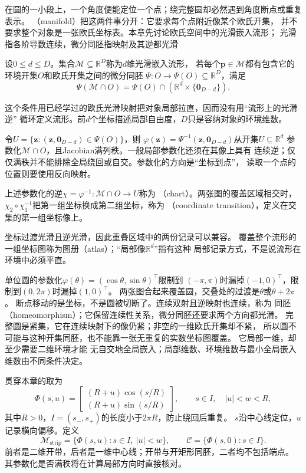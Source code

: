 在圆的一小段上，一个角度便能定位一个点；绕完整圆却必然遇到角度断点或重复表示。
（manifold）把这两件事分开：它要求每个点附近像某个欧氏开集，
并不要求整个对象是一张欧氏坐标表。本章先讨论欧氏空间中的光滑嵌入流形；
光滑指各阶导数连续，微分同胚指映射及其逆都光滑

\begin{definition}[光滑嵌入流形]
\label{def:geometry-embedded-manifold}
设$0\leq d\leq D$。集合$\mathcal M\subseteq\mathbb R^D$称为$d$维光滑嵌入流形，
若每个$\bm p\in\mathcal M$都有包含它的环境开集$O$和欧氏开集之间的微分同胚
$\Psi:O\to\Psi(O)\subseteq\mathbb R^D$，满足
\[
 \Psi(\mathcal M\cap O)
 =\Psi(O)\cap(\mathbb R^d\times\{\bm0_{D-d}\}).
\]
\end{definition}
这个条件用已经学过的欧氏光滑映射把对象局部拉直，因而没有用“流形上的光滑逆”
循环定义流形。前$d$个坐标描述局部自由度，$D$只是容纳对象的环境维数。

令$U=\{\bm z:(\bm z,\bm0_{D-d})\in\Psi(O)\}$，则
$\varphi(\bm z)=\Psi^{-1}(\bm z,\bm0_{D-d})$从开集$U\subseteq\mathbb R^d$
参数化$\mathcal M\cap O$，且Jacobian满列秩。一般局部参数化还须在其像上具有
连续逆；仅仅满秩并不能排除全局绕回或自交。参数化的方向是“坐标到点”，
读取一个点的位置则要使用反向映射。

\begin{definition}[局部坐标图与坐标过渡]
\label{def:geometry-chart-transition}
上述参数化的逆$\chi=\varphi^{-1}:\mathcal M\cap O\to U$称为
（chart）。两张图的覆盖区域相交时，
$\chi_2\circ\chi_1^{-1}$把第一组坐标换成第二组坐标，称为
（coordinate transition），定义在交集的第一组坐标像上。
\end{definition}
坐标过渡光滑且逆光滑，因此重叠区域中的两份记录可以兼容。
覆盖整个流形的一组坐标图称为图册（atlas）；“局部像$\mathbb R^d$”指有这种
局部记录方式，不是说流形在环境中必须平直。

单位圆的参数化$\varphi(\theta)=(\cos\theta,\sin\theta)^\top$限制到
$(-\pi,\pi)$时漏掉$(-1,0)^\top$，限制到$(0,2\pi)$时漏掉$(1,0)^\top$。
两张图合起来覆盖圆，交叠处的过渡是$\theta$或$\theta+2\pi$。
断点移动的是坐标，不是圆被切断了。连续双射且逆映射也连续，称为
同胚（homeomorphism）；它保留连续性关系，微分同胚还要求两个方向都光滑。
完整圆是紧集，它在连续映射下的像仍紧；非空的一维欧氏开集却不紧，
所以圆不可能与这种开集同胚，也不能靠一张无重复的实数坐标图覆盖。
它局部一维，却至少需要二维环境才能
无自交地全局嵌入；局部维数、环境维数与最小全局嵌入维数由不同条件决定。

贯穿本章的取为
\begin{equation}
 \Phi(s,u)=
 \begin{bmatrix}
 (R+u)\cos(s/R)\\(R+u)\sin(s/R)
 \end{bmatrix},
 \qquad s\in I,\quad |u|<w<R,
 \label{eq:geometry-curved-strip-parameterization}
\end{equation}
其中$R>0$，$I=(s_-,s_+)$的长度小于$2\pi R$，防止绕回后重复。
$s$沿中心线定位，$u$记录横向偏移。定义
\[
 \mathcal M_{\mathrm{strip}}=\{\Phi(s,u):s\in I,\ |u|<w\},
 \qquad \mathcal C=\{\Phi(s,0):s\in I\}.
\]
前者是二维开带，后者是一维中心线；开带与开矩形同胚，二者均不包括端点。
其参数化是否满秩将在计算局部方向时直接核对。

